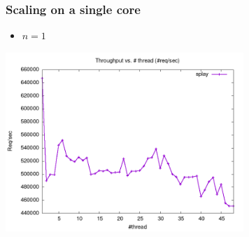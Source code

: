 \documentclass[11pt]{article}
\begin{document}
\subsubsection{Scaling on a single core}
\label{sec:orgf3e8461}
\begin{itemize}
\item \(n=1\)
\end{itemize}

\begin{center}
\includegraphics[width=9cm]{splay-cpu-bound-150.png}
\end{center}
\end{document}
